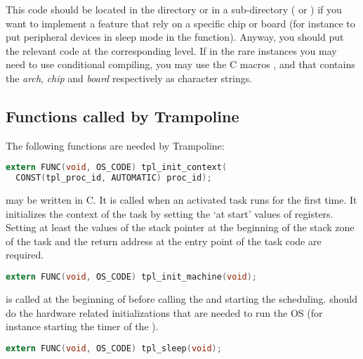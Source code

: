 
This code should be located in the  directory or in a sub-directory ( or ) if you want to implement a feature that rely on a specific chip or board (for instance to put peripheral devices in sleep mode in the  function). Anyway, you should put the relevant code at the corresponding level. If in the rare instances you may need to use conditional compiling, you may use the C macros ,  and  that contains the {\em arch}, {\em chip} and {\em board} respectively as character strings.  

\subsection{Functions called by Trampoline}

The following functions are needed by Trampoline:

\begin{lstlisting}[language=C]
extern FUNC(void, OS_CODE) tpl_init_context(
  CONST(tpl_proc_id, AUTOMATIC) proc_id);
\end{lstlisting}

 may be written in C. It is called when an activated task runs for the first time. It initializes the context of the task by setting the `at start' values of registers. Setting at least the values of the stack pointer at the beginning of the stack zone of the task and the return address at the entry point of the task code are required.

\begin{lstlisting}[language=C]
extern FUNC(void, OS_CODE) tpl_init_machine(void);
\end{lstlisting}

 is called at the beginning of  before calling the  and starting the scheduling.  should do the hardware related initializations that are needed to run the OS (for instance starting the timer of the ).

\begin{lstlisting}[language=C]
extern FUNC(void, OS_CODE) tpl_sleep(void);
\end{lstlisting}

